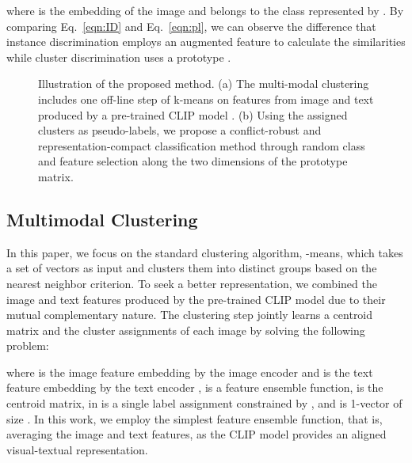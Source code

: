 \documentclass{article} \usepackage{iclr2023_conference,times}
\begin{document}
where  is the embedding of the image  and  belongs to the class represented by . 
By comparing Eq.~\ref{eqn:ID} and Eq.~\ref{eqn:pl}, we can observe the difference  that instance discrimination employs an augmented feature  to calculate the similarities while cluster discrimination uses a prototype .

\begin{figure}
\centering
{}
\hfill
{}
\caption{Illustration of the proposed method. (a) The multi-modal clustering includes one off-line step of k-means on features from image and text produced by a pre-trained CLIP model \citep{radford2021learning}. (b) Using the assigned clusters as pseudo-labels, we propose a conflict-robust and representation-compact classification method through random class and feature selection along the two dimensions of the prototype matrix.}
\vspace{-4mm}
\label{fig:clusterdiscrimination}
\end{figure}

\subsection{Multimodal Clustering} \label{sec:mcluster}
In this paper, we focus on the standard clustering algorithm, -means, which takes a set of vectors as input and clusters them into  distinct groups based on the nearest neighbor criterion. 
To seek a better representation, we combined the image and text features produced by the pre-trained CLIP model \citep{radford2021learning} due to their mutual complementary nature. 
The clustering step jointly learns a  centroid matrix  and the cluster assignments  of each image  by solving the following problem:
\vspace{-2mm}

where  is the image feature embedding by the image encoder  and  is the text feature embedding by the text encoder ,  is a feature ensemble function,  is the centroid matrix,  in  is a single label assignment constrained by , and  is 1-vector of size . In this work, we employ the simplest feature ensemble function, that is, averaging the image and text features, as the CLIP model provides an aligned visual-textual representation. 
\end{document}
